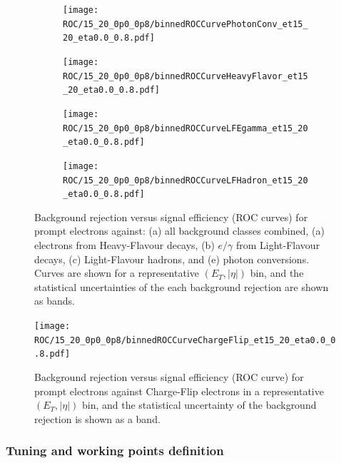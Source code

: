 \begin{figure}[h]
  \centering
  \begin{subfigure}[t]{0.5\linewidth}
    \centering
    \texttt{[image: ROC/15\_20\_0p0\_0p8/binnedROCCurvePhotonConv\_et15\_20\_eta0.0\_0.8.pdf]}
    \caption{}
    \label{fig:roc_pc}
  \end{subfigure}\hfill
  \begin{subfigure}[t]{0.5\linewidth}
    \centering
    \texttt{[image: ROC/15\_20\_0p0\_0p8/binnedROCCurveHeavyFlavor\_et15\_20\_eta0.0\_0.8.pdf]}
    \caption{}
    \label{fig:roc_hf}
  \end{subfigure}

  \vspace{0.35cm}

  \begin{subfigure}[t]{0.5\linewidth}
    \centering
    \texttt{[image: ROC/15\_20\_0p0\_0p8/binnedROCCurveLFEgamma\_et15\_20\_eta0.0\_0.8.pdf]}
    \caption{}
    \label{fig:roc_lfeg}
  \end{subfigure}\hfill
  \begin{subfigure}[t]{0.5\linewidth}
    \centering
    \texttt{[image: ROC/15\_20\_0p0\_0p8/binnedROCCurveLFHadron\_et15\_20\_eta0.0\_0.8.pdf]}
    \caption{}
    \label{fig:roc_lfh}
  \end{subfigure}

  \caption{Background rejection versus signal efficiency (ROC curves) for prompt electrons against:
  (a) all background classes combined,
  (a) electrons from Heavy-Flavour decays,
  (b) $e/\gamma$ from Light-Flavour decays,
  (c) Light-Flavour hadrons,
  and (e) photon conversions.
  Curves are shown for a representative $(E_{T}, |\eta|)$ bin, and the statistical uncertainties of the each background rejection are shown as bands.}
  \label{fig:roc_mainbkg}
\end{figure}


\begin{figure}[h]
  \centering
  \texttt{[image: ROC/15\_20\_0p0\_0p8/binnedROCCurveChargeFlip\_et15\_20\_eta0.0\_0.8.pdf]}
  \caption{Background rejection versus signal efficiency (ROC curve) for prompt electrons against Charge-Flip electrons in a representative $(E_{T}, |\eta|)$ bin, and the statistical uncertainty of the background rejection is shown as a band.}
  \label{fig:roc_cf}
\end{figure}

\FloatBarrier
\subsubsection{Tuning and working points definition}
\label{dnn:tuning}

